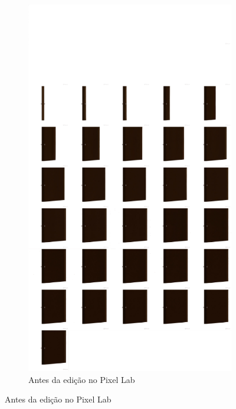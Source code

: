 \begin{figure}[htbp]
    \centering
    \caption{\small Processo de edição no Pixel Lab do sprite sheet da porta gerado pelo Vidu}
    \label{fig:pixelLabFinalPortaSideView}
    \begin{subfigure}{0.45\linewidth}
        \centering
        \includegraphics[width=1\linewidth]{figs/vidu/Pixilart/porta_sprite_sheet_pixel.png}
        \caption{\small Antes da edição no Pixel Lab}
        \label{fig:pixelLabFinalPortaSideView1}

\end{subfigure}
\end{figure}

